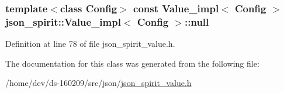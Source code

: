 \subsubsection[{null}]{\setlength{\rightskip}{0pt plus 5cm}template$<$class Config$>$ const {\bf Value\+\_\+impl}$<$ {\bf Config} $>$ {\bf json\+\_\+spirit\+::\+Value\+\_\+impl}$<$ {\bf Config} $>$\+::null\hspace{0.3cm}{\ttfamily [static]}}\label{classjson__spirit_1_1_value__impl_abb8ef4f2732e2c842afa716c456cb35d}


Definition at line 78 of file json\+\_\+spirit\+\_\+value.\+h.



The documentation for this class was generated from the following file\+:\begin{DoxyCompactItemize}
\item 
/home/dev/ds-\/160209/src/json/\hyperlink{json__spirit__value_8h}{json\+\_\+spirit\+\_\+value.\+h}\end{DoxyCompactItemize}
